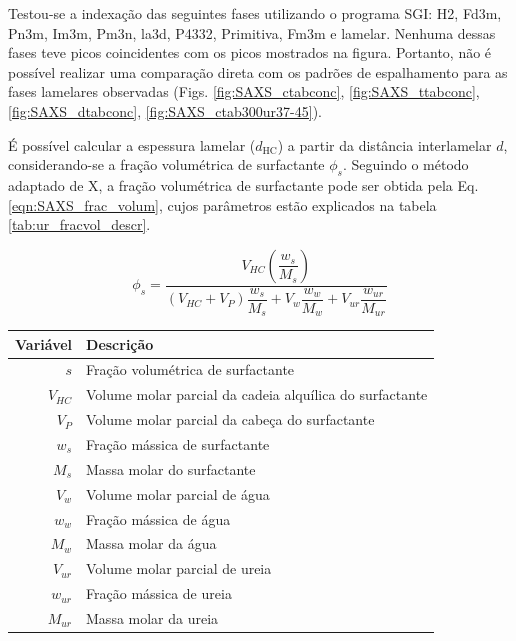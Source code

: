 	Testou-se a indexação das seguintes fases utilizando o programa SGI: H2, Fd3m, Pn3m, Im3m, Pm3n, la3d, P4332, Primitiva, Fm3m e lamelar. Nenhuma dessas fases teve picos coincidentes com os picos mostrados na figura. Portanto, não é possível realizar uma comparação direta com os padrões de espalhamento para as fases lamelares observadas (Figs. \ref{fig:SAXS_ctabconc}, \ref{fig:SAXS_ttabconc}, \ref{fig:SAXS_dtabconc}, \ref{fig:SAXS_ctab300ur37-45}).
	
	É possível calcular a espessura lamelar ($d_{\text{HC}}$) a partir da distância interlamelar $d$, considerando-se a fração volumétrica de surfactante $\phi_s$. Seguindo o método adaptado de X, a fração volumétrica de surfactante pode ser obtida pela Eq. \ref{eqn:SAXS_frac_volum}, cujos parâmetros estão explicados na tabela \ref{tab:ur_fracvol_descr}.
	
	\begin{equation}
		\phi_s = \dfrac{V_{\textit{HC}}\left( \dfrac{w_{s}}{M_{s}} \right)}{\left( V_{\textit{HC}} + V_{P} \right)\dfrac{w_{s}}{M_{s}} + V_{w}\dfrac{w_{w}}{M_{w}} + V_{\textit{ur}}\dfrac{w_{\textit{ur}}}{M_{\textit{ur}}}}
		\label{eqn:SAXS_frac_volum}
	\end{equation}

	\begin{table}[H]
		{\begin{tabular}{r l}
				\toprule
				Variável 					&	Descrição									\\
				\midrule
				$s$ 						& 	Fração volumétrica de surfactante			\\
				$V_{\textit{HC}}$			& 	Volume molar parcial da cadeia alquílica do surfactante \\
				$V_{P}$						& 	Volume molar parcial da cabeça do surfactante \\
				$w_{s}$						& 	Fração mássica de surfactante 				\\
				$M_{s}$						&   Massa molar do surfactante					\\
				\midrule
				$V_{w}$						&   Volume molar parcial de água				\\
				$w_{w}$						&	Fração mássica de água						\\
				$M_{w}$						&	Massa molar da água							\\
				\midrule
				$V_{\textit{ur}}$			&	Volume molar parcial de ureia				\\
				$w_{\textit{ur}}$			&	Fração mássica de ureia						\\
				$M_{\textit{ur}}$			&	Massa molar da ureia						\\
				\bottomrule
			\end{tabular}
		}%
		{}%
	\end{table}
	
